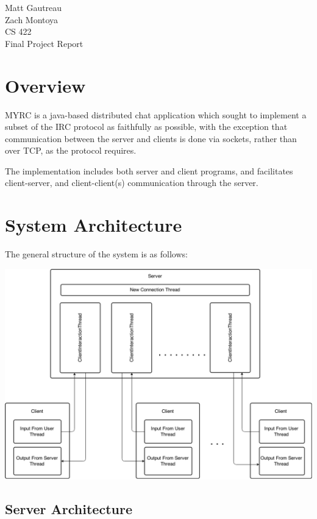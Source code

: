 \documentclass{article}
\begin{document}
\begin{flushright}
    Matt Gautreau\\
    Zach Montoya\\
    CS 422\\
    Final Project Report
\end{flushright}

\section{Overview}

MYRC is a java-based distributed chat application which sought to implement
a subset of the IRC protocol as faithfully as possible, with the exception that
communication between the server and clients is done via sockets, rather
than over TCP, as the protocol requires.

The implementation includes both server and client programs, and facilitates
client-server, and client-client(s) communication through the server.

\section{System Architecture}

The general structure of the system is as follows:

\begin{center}
\includegraphics[width=\linewidth]{architecture.png}
\end{center}

\subsection{Server Architecture}
\end{document}
